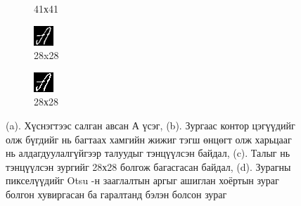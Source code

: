 \begin{figure}[H]
\begin{subfigure}{0.24\textwidth}
		\caption{41х41}
		\label{fig:letter_a_cropped}
	\end{subfigure}
	\begin{subfigure}{0.24\textwidth}
		\includegraphics[width=0.9\linewidth]{images/letter_a_resized}
		\caption{28x28}
		\label{fig:letter_a_resized}
	\end{subfigure}
	\begin{subfigure}{0.24\textwidth}
		\includegraphics[width=0.9\linewidth]{images/letter_a_final}
		\caption{28х28}
		\label{fig:letter_a_final}
	\end{subfigure}

	\caption{(a). Хүснэгтээс салган авсан А үсэг, (b). Зургаас контор цэгүүдийг олж бүгдийг нь багтаах хамгийн жижиг тэгш өнцөгт олж харьцааг нь алдагдуулалгүйгээр талуудыг тэнцүүлсэн байдал, (c). Талыг нь тэнцүүлсэн зургийг 28х28 болгож багасгасан байдал, (d). Зурагны пикселүүдийг Otsu -н зааглалтын аргыг ашиглан хоёртын зураг болгон хувиргасан ба гаралтанд бэлэн болсон зураг}
	\label{fig:letter_a}
\end{figure}


